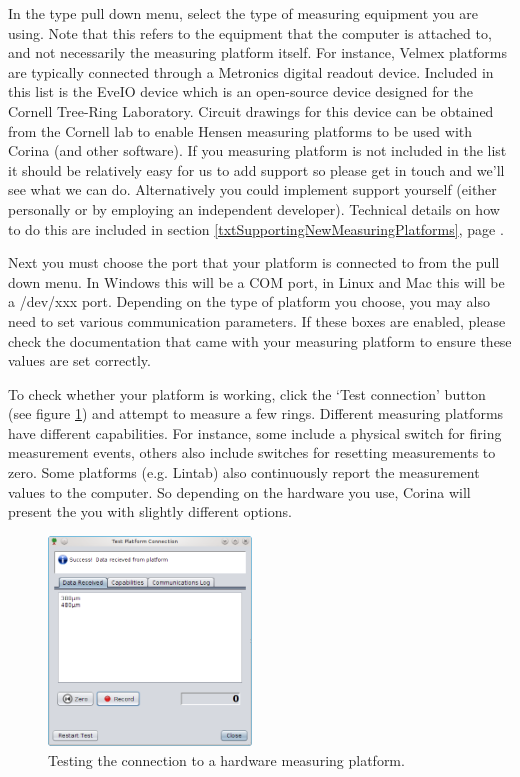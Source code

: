 In the type pull down menu, select the type of measuring equipment you are using. Note that this refers to the equipment that the computer is attached to, and not necessarily the measuring platform itself. For instance, Velmex platforms are typically connected through a Metronics digital readout device. Included in this list is the EveIO device which is an open-source device designed for the Cornell Tree-Ring Laboratory. Circuit drawings for this device can be obtained from the Cornell lab to enable Hensen measuring platforms to be used with Corina (and other software).  If you measuring platform is not included in the list it should be relatively easy for us to add support so please get in touch and we'll see what we can do.  Alternatively you could implement support yourself (either personally or by employing an independent developer).  Technical details on how to do this are included in section \ref{txtSupportingNewMeasuringPlatforms}, page \pageref{txtSupportingNewMeasuringPlatforms}.  

Next you must choose the port that your platform is connected to from the pull down menu. In Windows this will be a COM port, in Linux and Mac this will be a /dev/xxx port.  Depending on the type of platform you choose, you may also need to set various communication parameters.  If these boxes are enabled, please check the documentation that came with your measuring platform to ensure these values are set correctly.

To check whether your platform is working, click the `Test connection' button (see figure \ref{fig:hardwaretest}) and attempt to measure a few rings.  Different measuring platforms have different capabilities.  For instance, some include a physical switch for firing measurement events, others also include switches for resetting measurements to zero.  Some platforms (e.g. Lintab) also continuously report the measurement values to the computer.  So depending on the hardware you use, Corina will present the you with slightly different options.  

\begin{figure}
  \begin{center}
    \includegraphics[width=0.48\textwidth]{Images/hardwaretestdialog.png}
  \end{center}
    \caption{Testing the connection to a hardware measuring platform.}
    \label{fig:hardwaretest}
\end{figure}



